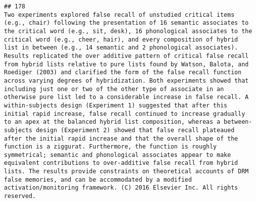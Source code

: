\documentclass[
  english,
  man]{apa6}
\begin{document}
\begin{verbatim}
## 178                                                                                                                                                                                                                                                                                                                                                                                                                                                                                                                                                                                                                                                                                                                                                                                                                                                                                                                                                                                                                                                                                                                                Two experiments explored false recall of unstudied critical items (e.g., chair) following the presentation of 16 semantic associates to the critical word (e.g., sit, desk), 16 phonological associates to the critical word (e.g., cheer, hair), and every composition of hybrid list in between (e.g., 14 semantic and 2 phonological associates). Results replicated the over additive pattern of critical false recall from hybrid lists relative to pure lists found by Watson, Balota, and Roediger (2003) and clarified the form of the false recall function across varying degrees of hybridization. Both experiments showed that including just one or two of the other type of associate in an otherwise pure list led to a considerable increase in false recall. A within-subjects design (Experiment 1) suggested that after this initial rapid increase, false recall continued to increase gradually to an apex at the balanced hybrid list composition, whereas a between-subjects design (Experiment 2) showed that false recall plateaued after the initial rapid increase and that the overall shape of the function is a ziggurat. Furthermore, the function is roughly symmetrical; semantic and phonological associates appear to make equivalent contributions to over-additive false recall from hybrid lists. The results provide constraints on theoretical accounts of DRM false memories, and can be accommodated by a modified activation/monitoring framework. (C) 2016 Elsevier Inc. All rights reserved.

\end{verbatim}
\end{document}
